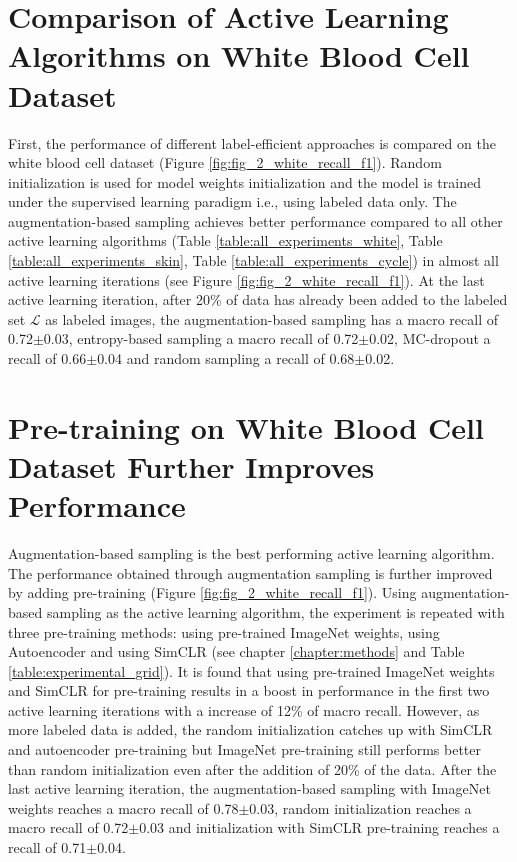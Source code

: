\section{Comparison of Active Learning Algorithms on White Blood Cell Dataset}
First, the performance of different label-efficient approaches is compared on the white blood cell dataset (Figure \ref{fig:fig_2_white_recall_f1}). Random initialization is used for model weights initialization and the model is trained under the supervised learning paradigm i.e., using labeled data only. The augmentation-based sampling achieves better performance compared to all other active learning algorithms (Table \ref{table:all_experiments_white}, Table \ref{table:all_experiments_skin}, Table \ref{table:all_experiments_cycle}) in almost all active learning iterations (see Figure \ref{fig:fig_2_white_recall_f1}). At the last active learning iteration, after 20\% of data has already been added to the labeled set $\mathcal{L}$ as labeled images, the augmentation-based sampling has a macro recall of 0.72$\pm$0.03, entropy-based sampling a macro recall of 0.72$\pm$0.02, MC-dropout a recall of 0.66$\pm$0.04 and random sampling a recall of 0.68$\pm$0.02.

\section{Pre-training on White Blood Cell Dataset Further Improves Performance}
Augmentation-based sampling is the best performing active learning algorithm. The performance obtained through augmentation sampling is further improved by adding pre-training (Figure \ref{fig:fig_2_white_recall_f1}). Using augmentation-based sampling as the active learning algorithm, the experiment is repeated with three pre-training methods: using pre-trained ImageNet weights, using Autoencoder and using SimCLR (see chapter \ref{chapter:methods} and Table \ref{table:experimental_grid}). It is found that using pre-trained ImageNet  weights and SimCLR for pre-training results in a boost in performance in the first two active learning iterations with a increase of 12\% of macro recall. However, as more labeled data is added, the random initialization catches up with SimCLR and autoencoder pre-training but ImageNet pre-training still performs better than random initialization even after the addition of 20\% of the data. After the last active learning iteration, the  augmentation-based sampling with ImageNet weights reaches a macro recall of 0.78$\pm$0.03, random initialization reaches a macro recall of 0.72$\pm$0.03 and initialization with SimCLR pre-training reaches a recall of 0.71$\pm$0.04.

